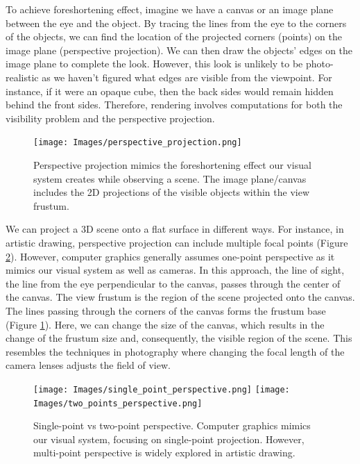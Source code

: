 To achieve foreshortening effect, imagine we have a canvas or an image plane between the eye and the object. By tracing the lines from the eye to the corners of the objects, we can find the location of the projected corners (points) on the image plane (perspective projection). We can then draw the objects' edges on the image plane to complete the look. However, this look is unlikely to be photo-realistic as we haven't figured what edges are visible from the viewpoint. For instance, if it were an opaque cube, then the back sides would remain hidden behind the front sides. Therefore, rendering involves computations for both the visibility problem and the perspective projection. 

\begin{figure}[ht]
  \centering
   \texttt{[image: Images/perspective\_projection.png]}
   \caption{Perspective projection mimics the foreshortening effect our visual system creates while observing a scene. The image plane/canvas includes the 2D projections of the visible objects within the view frustum.}
   \label{fig:perspective_projection}
\end{figure}


We can project a 3D scene onto a flat surface in different ways. For instance, in artistic drawing, perspective projection can include multiple focal points (Figure \ref{fig:artistic_drawing}). However, computer graphics generally assumes one-point perspective as it mimics our visual system as well as cameras. In this approach, the line of sight, the line from the eye perpendicular to the canvas, passes through the center of the canvas. The view frustum is the region of the scene projected onto the canvas. The lines passing through the corners of the canvas forms the frustum base (Figure \ref{fig:perspective_projection}). Here, we can change the size of the canvas, which results in the change of the frustum size and, consequently, the visible region of the scene. This resembles the techniques in photography where changing the focal length of the camera lenses adjusts the field of view.

\begin{figure}[ht]
  \centering
   \texttt{[image: Images/single\_point\_perspective.png]}
    \texttt{[image: Images/two\_points\_perspective.png]}

   \caption{Single-point vs two-point perspective. Computer graphics mimics our visual system, focusing on single-point projection. However, multi-point perspective is widely explored in artistic drawing.}
   \label{fig:artistic_drawing}
\end{figure}


